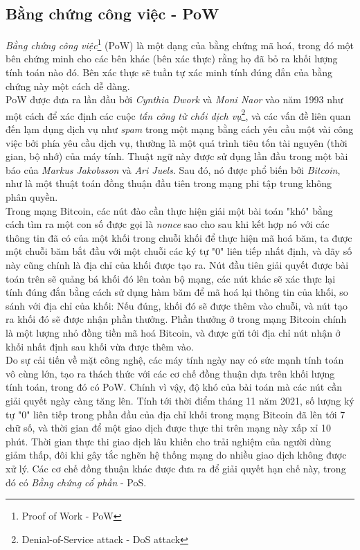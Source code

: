 \subsection{Bằng chứng công việc - PoW}

\textit{Bằng chứng công việc}\footnote{Proof of Work - PoW} (PoW) là một dạng của bằng chứng mã hoá, trong đó một bên chứng minh cho các bên khác (bên xác thực) rằng họ đã bỏ ra khối lượng tính toán nào đó. Bên xác thực sẽ tuần tự xác minh tính đúng đắn của bằng chứng này một cách dễ dàng.\\

PoW được đưa ra lần đầu bởi \textit{Cynthia Dwork} và \textit{Moni Naor} vào năm 1993 như một cách để xác định các cuộc \textit{tấn công từ chối dịch vụ}\footnote{Denial-of-Service attack - DoS attack}, và các vấn đề liên quan đến lạm dụng dịch vụ như \textit{spam} trong một mạng bằng cách yêu cầu một vài công việc bởi phía yêu cầu dịch vụ, thường là một quá trình tiêu tốn tài nguyên (thời gian, bộ nhớ) của máy tính. Thuật ngữ này được sử dụng lần đầu trong một bài báo của \textit{Markus Jakobsson} và \textit{Ari Juels}. Sau đó, nó được phổ biến bởi \textit{Bitcoin}, như là một thuật toán đồng thuận đầu tiên trong mạng phi tập trung không phân quyền.\\

Trong mạng Bitcoin, các nút đào cần thực hiện giải một bài toán "khó" bằng cách tìm ra một con số được gọi là \textit{nonce} sao cho sau khi kết hợp nó với các thông tin đã có của một khối trong chuỗi khối để thực hiện mã hoá băm, ta được một chuỗi băm bắt đầu với một chuỗi các ký tự "0" liên tiếp nhất định, và dãy số này cũng chính là địa chỉ của khối được tạo ra. Nút đầu tiên giải quyết được bài toán trên sẽ quảng bá khối đó lên toàn bộ mạng, các nút khác sẽ xác thực lại tính đúng đắn bằng cách sử dụng hàm băm để mã hoá lại thông tin của khối, so sánh với địa chỉ của khối: Nếu đúng, khối đó sẽ được thêm vào chuỗi, và nút tạo ra khối đó sẽ được nhận phần thưởng. Phần thưởng ở trong mạng Bitcoin chính là một lượng nhỏ đồng tiền mã hoá Bitcoin, và được gửi tới địa chỉ nút nhận ở khối nhất định sau khối vừa được thêm vào.\\

Do sự cải tiến về mặt công nghệ, các máy tính ngày nay có sức mạnh tính toán vô cùng lớn, tạo ra thách thức với các cơ chế đồng thuận dựa trên khối lượng tính toán, trong đó có PoW. Chính vì vậy, độ khó của bài toán mà các nút cần giải quyết ngày càng tăng lên. Tính tới thời điểm tháng 11 năm 2021, số lượng ký tự "0" liên tiếp trong phần đầu của địa chỉ khối trong mạng Bitcoin đã lên tới 7 chữ số, và thời gian để một giao dịch được thực thi trên mạng này xấp xỉ 10 phút. Thời gian thực thi giao dịch lâu khiến cho trải nghiệm của người dùng giảm thấp, đôi khi gây tắc nghẽn hệ thống mạng do nhiều giao dịch không được xử lý. Các cơ chế đồng thuận khác được đưa ra để giải quyết hạn chế này, trong đó có \textit{Bằng chứng cổ phần} - PoS.